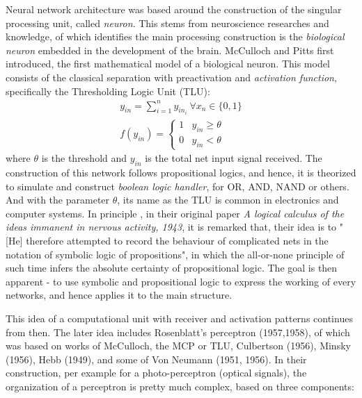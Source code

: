 Neural network architecture was based around the construction of the singular processing unit, called \textit{neuron}. This stems from neuroscience researches and knowledge, of which identifies the main processing construction is the \textit{biological neuron} embedded in the development of the brain. McCulloch and Pitts first introduced, the first mathematical model of a biological neuron. This model consists of the classical separation with preactivation and \textit{activation function}, specifically the Thresholding Logic Unit (TLU): 
\begin{align}
  y_{in} = \sum_{i =1}^{n} y_{in_{i}}\: \forall x_{n} \in \{0,1\} \\
  f(y_{in}) = 
  \begin{cases}
    1 & y_{in} \geq \theta \\
    0 & y_{in} < \theta
  \end{cases}
\end{align}
where \(\theta\) is the threshold and \(y_{in}\) is the total net input signal received. The construction of this network follows propositional logics, and hence, it is theorized to simulate and construct \textit{boolean logic handler}, for OR, AND, NAND or others. And with the parameter $\theta$, its name as the TLU is common in electronics and computer systems. In principle , in their original paper \textit{A logical calculus of the ideas immanent in nervous activity, 1943}, it is remarked that, their idea is to "[He] therefore attempted to record the behaviour of complicated nets in the notation of symbolic logic of propositions", in which the all-or-none principle of such time infers the absolute certainty of propositional logic. The goal is then apparent - to use symbolic and propositional logic to express the working of every networks, and hence applies it to the main structure. 

This idea of a computational unit with receiver and activation patterns continues from then. The later idea includes Rosenblatt's perceptron (1957,1958), of which was based on works of McCulloch, the MCP or TLU, Culbertson (1956), Minsky  (1956), Hebb (1949), and some of Von Neumann (1951, 1956). In their construction, per example for a photo-perceptron (optical signals), the organization of a perceptron is pretty much complex, based on three components: 

